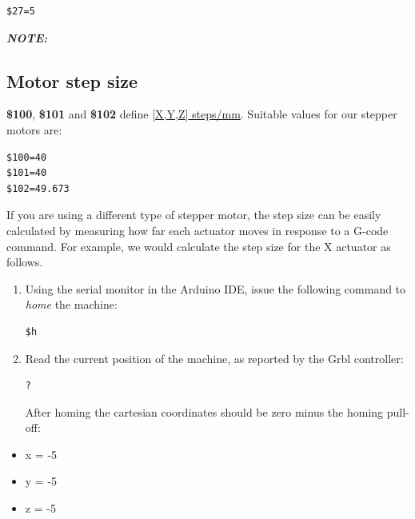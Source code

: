 \documentclass[]{book}
\providecommand{\tightlist}{%
  \setlength{\itemsep}{0pt}\setlength{\parskip}{0pt}}
\theoremstyle{definition}
\theoremstyle{definition}
\theoremstyle{remark}
\begin{document}
\begin{verbatim}
$27=5
\end{verbatim}

\emph{\textbf{NOTE: }}

\subsection{Motor step size}\label{motor-step-size}

\textbf{\$100}, \textbf{\$101} and \textbf{\$102} define
\href{https://github.com/gnea/grbl/wiki/Grbl-v1.1-Configuration\#100-101-and-102--xyz-stepsmm}{{[}X,Y,Z{]}
steps/mm}. Suitable values for our stepper motors are:

\begin{verbatim}
$100=40
$101=40
$102=49.673
\end{verbatim}

If you are using a different type of stepper motor, the step size can be
easily calculated by measuring how far each actuator moves in response
to a G-code command. For example, we would calculate the step size for
the X actuator as follows.

\begin{enumerate}
\def\labelenumi{\arabic{enumi}.}
\item
  Using the serial monitor in the Arduino IDE, issue the following
  command to \emph{home} the machine:

\begin{verbatim}
$h
\end{verbatim}
\item
  Read the current position of the machine, as reported by the Grbl
  controller:

\begin{verbatim}
?
\end{verbatim}

  After homing the cartesian coordinates should be zero minus the homing
  pull-off:
\end{enumerate}

\begin{itemize}
\tightlist
\item
  x = -5
\item
  y = -5
\item
  z = -5
\end{itemize}
\end{document}
